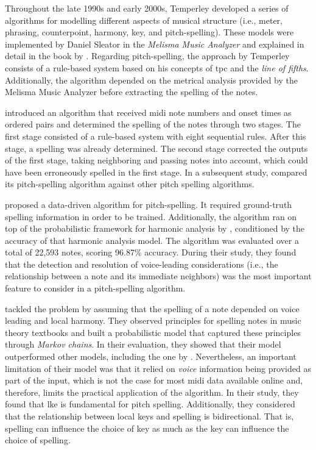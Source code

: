 Throughout the late 1990s and early 2000s, Temperley
developed a series of algorithms for modelling different
aspects of musical structure (i.e., meter, phrasing,
counterpoint, harmony, key, and pitch-spelling). These
models were implemented by Daniel Sleator in the
\emph{Melisma Music Analyzer} and explained in detail in the
book by \textcite{temperley2004cognition}. Regarding
pitch-spelling, the approach by Temperley consists of a
rule-based system based on his concepts of \gls{tpc} and the
\emph{line of fifths}. Additionally, the algorithm depended
on the metrical analysis provided by the Melisma Music
Analyzer before extracting the spelling of the notes.

\textcite{meredith2003pitch} introduced an algorithm that
received \gls{midi} note numbers and onset times as ordered
pairs and determined the spelling of the notes through two
stages. The first stage consisted of a rule-based system
with eight sequential rules. After this stage, a spelling
was already determined. The second stage corrected the
outputs of the first stage, taking neighboring and passing
notes into account, which could have been erroneously
spelled in the first stage. In a subsequent study,
\textcite{meredith2005comparing} compared its pitch-spelling
algorithm against other pitch spelling algorithms.

\textcite{stoddard2004welltempered} proposed a data-driven
algorithm for pitch-spelling. It required ground-truth
spelling information in order to be trained. Additionally,
the algorithm ran on top of the probabilistic framework for
harmonic analysis by \textcite{raphael2003harmonic},
conditioned by the accuracy of that harmonic analysis model.
The algorithm was evaluated over a total of 22,593 notes,
scoring 96.87\% accuracy. During their study, they found
that the detection and resolution of voice-leading
considerations (i.e., the relationship between a note and
its immediate neighbors) was the most important feature to
consider in a pitch-spelling algorithm.

\textcite{teodoru2007pitch} tackled the problem by assuming
that the spelling of a note depended on voice leading and
local harmony. They observed principles for spelling notes
in music theory textbooks
\parencite{aldwell1978harmony,rimskykorsakov2005practical}
and built a probabilistic model that captured these
principles through \emph{Markov chains}. In their
evaluation, they showed that their model outperformed other
models, including the one by \textcite{meredith2006ps13}.
Nevertheless, an important limitation of their model was
that it relied on \emph{voice} information being provided as
part of the input, which is not the case for most \gls{midi}
data available online and, therefore, limits the practical
application of the algorithm. In their study, they found
that \gls{lke} is fundamental for pitch spelling.
Additionally, they considered that the relationship between
local keys and spelling is bidirectional. That is, spelling
can influence the choice of key as much as the key can
influence the choice of spelling.
